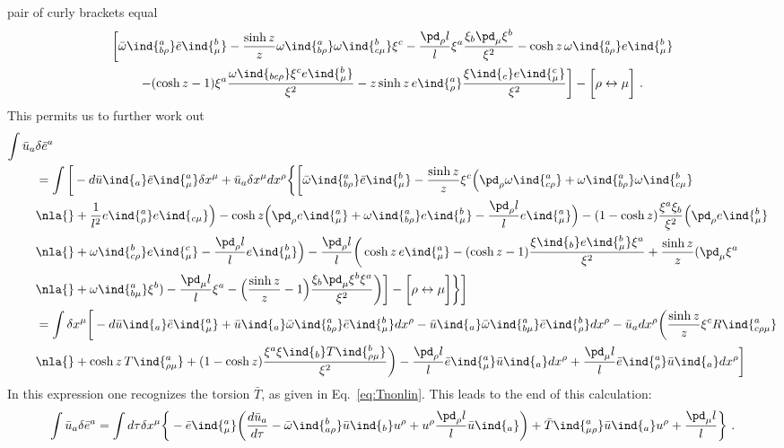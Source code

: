\documentclass[11pt]{article}
\begin{document}
pair of curly brackets equal
\begin{multline*}
	\bigg[ \bar{\omega}\ind{^a_{b\rho}} \bar{e}\ind{^b_\mu} - 
	\frac{\sinh z}{z} \omega\ind{^a_{b\rho}} \omega\ind{^b_{c\mu}} 
	\xi^c - \frac{\pd_\rho l}{l} \xi^a \frac{\xi_b \pd_\mu 
		\xi^b}{\xi^2} - \cosh z\, \omega\ind{^a_{b\rho}} 
	e\ind{^b_\mu}
	\\
	- (\cosh z - 1) \xi^a \frac{\omega\ind{_{bc\rho}} \xi^c 
		e\ind{^b_\mu}}{\xi^2} - z \sinh z\, e\ind{^a_\rho} 
	\frac{\xi\ind{_c} e\ind{^c_\mu}}{\xi^2} \bigg] - \bigg[ \rho 
	\leftrightarrow \mu \bigg]~.
\end{multline*}
This permits us to further work out
\begin{displaymath}
\begin{split}
	\int \bar{u}_a &\delta\bar{e}^a \\
	&= \int \bigg[ -d\bar{u}\ind{_a} \bar{e}\ind{^a_\mu} \delta 
	x^\mu + \bar{u}_a \delta x^\mu dx^\rho \bigg\{ \bigg[ 
	\bar{\omega}\ind{^a_{b\rho}} \bar{e}\ind{^b_\mu} - \frac{\sinh 
		z}{z} \xi^c \Big( \pd_\rho \omega\ind{^a_{c\rho}} + 
	\omega\ind{^a_{b\rho}} \omega\ind{^b_{c\mu}}
	\\
	&\nla{} + \frac{1}{l^2} e\ind{^a_\rho} e\ind{_{c\mu}} \Big) - 
	\cosh z \Big( \pd_\rho e\ind{^a_\mu} + \omega\ind{^a_{b\rho}} 
	e\ind{^b_\mu} - \frac{\pd_\rho l}{l} e\ind{^a_\mu} \Big) - (1 
	- \cosh z) \frac{\xi^a \xi_b}{\xi^2} \Big( \pd_\rho 
	e\ind{^b_\mu}
	\\
	&\nla{} + \omega\ind{^b_{c\rho}} e\ind{^c_\mu} - 
	\frac{\pd_\rho l}{l} e\ind{^b_\mu} \Big) - \frac{\pd_\rho 
		l}{l} \bigg( \cosh z\, e\ind{^a_\mu} - (\cosh z - 1) 
	\frac{\xi\ind{_b} e\ind{^b_\mu} \xi^a}{\xi^2} + \frac{\sinh 
		z}{z}(\pd_\mu \xi^a
	\\
	&\nla{} + \omega\ind{^a_{b\mu}} \xi^b)- \frac{\pd_\mu l}{l} 
	\xi^a - \Big( \frac{\sinh z}{z} - 1 \Big) \frac{\xi_b \pd_\mu 
		\xi^b \xi^a}{\xi^2} \bigg) \bigg] - \bigg[ \rho 
	\leftrightarrow \mu \bigg] \bigg\} \bigg]
	\\
	&= \int \delta x^\mu \bigg[ -d\bar{u}\ind{_a} 
	\bar{e}\ind{^a_\mu} + \bar{u}\ind{_a} 
	\bar{\omega}\ind{^a_{b\rho}} \bar{e}\ind{^b_\mu} dx^\rho - 
	\bar{u}\ind{_a} \bar{\omega}\ind{^a_{b\mu}} 
	\bar{e}\ind{^b_\rho} dx^\rho - \bar{u}_a dx^\rho \bigg( 
		\frac{\sinh z}{z} \xi^c R\ind{^a_{c\rho\mu}}
	\\
	&\nla{} + \cosh z\, T\ind{^a_{\rho\mu}} + (1 - \cosh z) 
	\frac{\xi^a \xi\ind{_b} T\ind{^b_{\rho\mu}}}{\xi^2} \bigg) - 
	\frac{\pd_\rho l}{l} \bar{e}\ind{^a_\mu} \bar{u}\ind{_a} 
	dx^\rho + \frac{\pd_\mu l}{l} \bar{e}\ind{^a_\rho} 
	\bar{u}\ind{_a} dx^\rho \bigg]
\end{split}
\end{displaymath}
In this expression one recognizes the torsion $\bar{T}$, as given 
in Eq.~\eqref{eq:Tnonlin}. This leads to the end of this 
calculation:
\begin{equation}
	\int \bar{u}_a \delta\bar{e}^a = \int d\tau \delta x^\mu 
	\bigg\{ - \bar{e}\ind{^a_\mu} \bigg( \frac{d\bar{u}_a}{d\tau} 
	- \bar{\omega}\ind{^b_{a\rho}} \bar{u}\ind{_b} u^\rho + u^\rho 
	\frac{\pd_\rho l}{l} \bar{u}\ind{_a} \bigg) + 
	\bar{T}\ind{^a_{\mu\rho}} \bar{u}\ind{_a} u^\rho + 
	\frac{\pd_\mu l}{l} \bigg\}~.
\end{equation}
\end{document}
